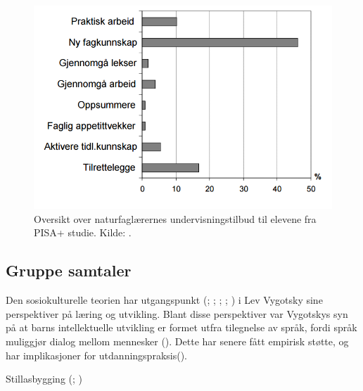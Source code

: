 \documentclass[main.tex]{subfiles}
\begin{document}
\begin{figure}[h!]
\includegraphics[scale = 0.6]{../figures/undervisnings_aktivitet.png}
\caption{Oversikt over naturfaglærernes undervisningstilbud til elevene fra PISA+ studie. Kilde: 
\protect{}.}
\label{fig:odeg10}
\end{figure}

\subsection*{Gruppe samtaler}
Den sosiokulturelle teorien har utgangspunkt (; ; 
; ; ) i Lev Vygotsky sine 
perspektiver på læring og utvikling. Blant disse perspektiver var Vygotskys syn på at barns 
intellektuelle utvikling er formet utfra tilegnelse av språk, fordi språk muliggjør dialog 
mellom mennesker (). Dette har senere fått empirisk
støtte, og har implikasjoner for utdanningspraksis().

Stillasbygging (; )
\end{document}
